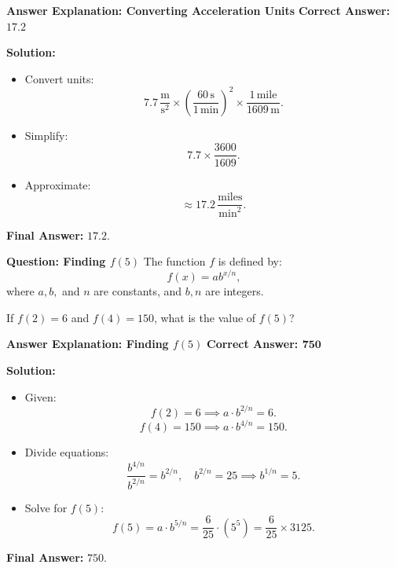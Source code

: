 \documentclass{beamer}
\begin{document}
\begin{frame}{\textbf{Answer Explanation: Converting Acceleration Units}}
    \textbf{Correct Answer: \textcolor{novelPurple}{\( \mathbf{17.2} \)}}  

    \vspace{0.3cm}
    \textbf{Solution:}
    \begin{itemize}
        \item Convert units:
        \[
        7.7 \, \frac{\text{m}}{\text{s}^2} \times \left(\frac{60 \, \text{s}}{1 \, \text{min}}\right)^2 \times \frac{1 \, \text{mile}}{1609 \, \text{m}}.
        \]
        \item Simplify:
        \[
        7.7 \times \frac{3600}{1609}.
        \]
        \item Approximate:
        \[
        \approx 17.2 \, \frac{\text{miles}}{\text{min}^2}.
        \]
    \end{itemize}
    \textbf{Final Answer:} \( \boxed{17.2} \).
\end{frame}

\begin{frame}{\textbf{Question: Finding \( f(5) \)}}
    The function \( f \) is defined by:
    \[
    f(x) = ab^{x/n},
    \]
    where \( a, b, \) and \( n \) are constants, and \( b, n \) are integers.  

    \vspace{0.3cm}
    If \( f(2) = 6 \) and \( f(4) = 150 \), what is the value of \( f(5) \)?
\end{frame}

\begin{frame}{\textbf{Answer Explanation: Finding \( f(5) \)}}
    \textbf{Correct Answer: \textcolor{novelPurple}{\( \mathbf{750} \)}}  

    \vspace{0.3cm}
    \textbf{Solution:}
    \begin{itemize}
        \item Given:
        \[
        f(2) = 6 \implies a \cdot b^{2/n} = 6.
        \]
        \[
        f(4) = 150 \implies a \cdot b^{4/n} = 150.
        \]
        \item Divide equations:
        \[
        \frac{b^{4/n}}{b^{2/n}} = b^{2/n}, \quad b^{2/n} = 25 \implies b^{1/n} = 5.
        \]
        \item Solve for \( f(5) \):
        \[
        f(5) = a \cdot b^{5/n} = \frac{6}{25} \cdot (5^5) = \frac{6}{25} \times 3125.
        \]
    \end{itemize}
    \textbf{Final Answer:} \( \boxed{750} \).
\end{frame}
\end{document}
